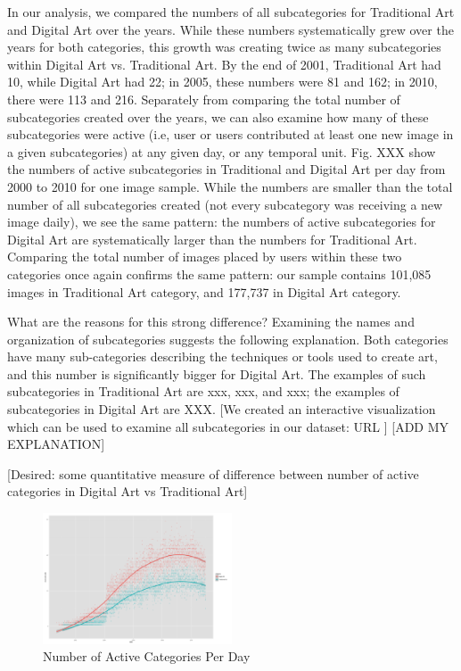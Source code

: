 \documentclass[letterpaper]{article}
\begin{document}
In our analysis, we compared the numbers of all subcategories for Traditional Art and Digital Art over the years. While these numbers systematically grew over the years for both categories, this growth was creating twice as many subcategories within Digital Art vs. Traditional Art. By the end of 2001, Traditional Art had 10, while Digital Art had 22; in 2005, these numbers were 81 and 162; in 2010, there were 113 and 216. Separately from comparing the total number of subcategories created over the years, we can also examine how many of these subcategories were active (i.e, user or users contributed at least one new image in a given subcategories) at any given day, or any temporal unit. Fig. XXX show the numbers of active subcategories in Traditional and Digital Art per day from 2000 to 2010 for one image sample. While the numbers are smaller than the total number of all subcategories created (not every subcategory was receiving a new image daily), we see the same pattern: the numbers of active subcategories for Digital Art are systematically larger than the numbers for Traditional Art. Comparing the total number of images placed by users within these two categories once again confirms the same pattern: our sample contains 101,085 images in Traditional Art category, and 177,737 in Digital Art category.
    
What are the reasons for this strong difference? Examining the names and organization of subcategories suggests the following explanation. Both categories have many sub-categories describing the techniques or tools used to create art, and this number is significantly bigger for Digital Art. The examples of such subcategories in Traditional Art are xxx, xxx, and xxx; the examples of subcategories in Digital Art are XXX. [We created an interactive visualization which can be used to examine all subcategories in our dataset: URL ]  [ADD MY EXPLANATION]
    

[Desired: some quantitative measure of difference between number of active categories in Digital Art vs Traditional Art] 

 
\begin{figure}
    \includegraphics[width=0.5\textwidth]{active_categories_per_date}
    \caption{Number of Active Categories Per Day}
\end{figure}
\end{document}
